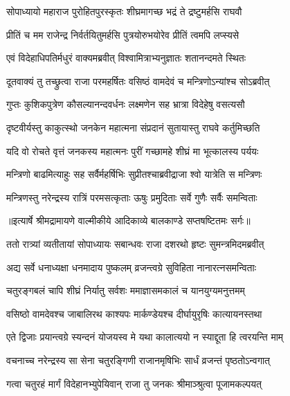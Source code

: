 \twolineshloka
{सोपाध्यायो महाराज पुरोहितपुरस्कृतः}
{शीघ्रमागच्छ भद्रं ते द्रष्टुमर्हसि राघवौ} %

\twolineshloka
{प्रीतिं च मम राजेन्द्र निर्वर्तयितुमर्हसि}
{पुत्रयोरुभयोरेव प्रीतिं त्वमपि लप्स्यसे} %

\twolineshloka
{एवं विदेहाधिपतिर्मधुरं वाक्यमब्रवीत्}
{विश्वामित्राभ्यनुज्ञातः शतानन्दमते स्थितः} %

\twolineshloka
{दूतवाक्यं तु तच्छ्रुत्वा राजा परमहर्षितः}
{वसिष्ठं वामदेवं च मन्त्रिणोऽन्यांश्च सोऽब्रवीत्} %

\twolineshloka
{गुप्तः कुशिकपुत्रेण कौसल्यानन्दवर्धनः}
{लक्ष्मणेन सह भ्रात्रा विदेहेषु वसत्यसौ} %

\twolineshloka
{दृष्टवीर्यस्तु काकुत्स्थो जनकेन महात्मना}
{संप्रदानं सुतायास्तु राघवे कर्तुमिच्छति} %

\twolineshloka
{यदि वो रोचते वृत्तं जनकस्य महात्मनः}
{पुरीं गच्छामहे शीघ्रं मा भूत्कालस्य पर्ययः} %

\twolineshloka
{मन्त्रिणो बाढमित्याहुः सह सर्वैर्महर्षिभिः}
{सुप्रीतश्चाब्रवीद्राजा श्वो यात्रेति स मन्त्रिणः} %

\twolineshloka
{मन्त्रिणस्तु नरेन्द्रस्य रात्रिं परमसत्कृताः}
{ऊषुः प्रमुदिताः सर्वे गुणैः सर्वैः समन्विताः} %


{॥इत्यार्षे श्रीमद्रामायणे वाल्मीकीये आदिकाव्ये बालकाण्डे सप्तषष्टितमः सर्गः॥}


\twolineshloka
{ततो रात्र्यां व्यतीतायां सोपाध्यायः सबान्धवः}
{राजा दशरथो हृष्टः सुमन्त्रमिदमब्रवीत्} %

\twolineshloka
{अद्य सर्वे धनाध्यक्षा धनमादाय पुष्कलम्}
{व्रजन्त्वग्रे सुविहिता नानारत्नसमन्विताः} %

\twolineshloka
{चतुरङ्गबलं चापि शीघ्रं निर्यातु सर्वशः}
{ममाज्ञासमकालं च यानयुग्यमनुत्तमम्} %

\twolineshloka
{वसिष्ठो वामदेवश्च जाबालिरथ काश्यपः}
{मार्कण्डेयश्च दीर्घायुरृषिः कात्यायनस्तथा} %

\twolineshloka
{एते द्विजाः प्रयान्त्वग्रे स्यन्दनं योजयस्व मे}
{यथा कालात्ययो न स्याद्दूता हि त्वरयन्ति माम्} %

\twolineshloka
{वचनाच्च नरेन्द्रस्य सा सेना चतुरङ्गिणी}
{राजानमृषिभिः सार्धं व्रजन्तं पृष्ठतोऽन्वगात्} %

\twolineshloka
{गत्वा चतुरहं मार्गं विदेहानभ्युपेयिवान्}
{राजा तु जनकः श्रीमाञ्श्रुत्वा पूजामकल्पयत्} %

